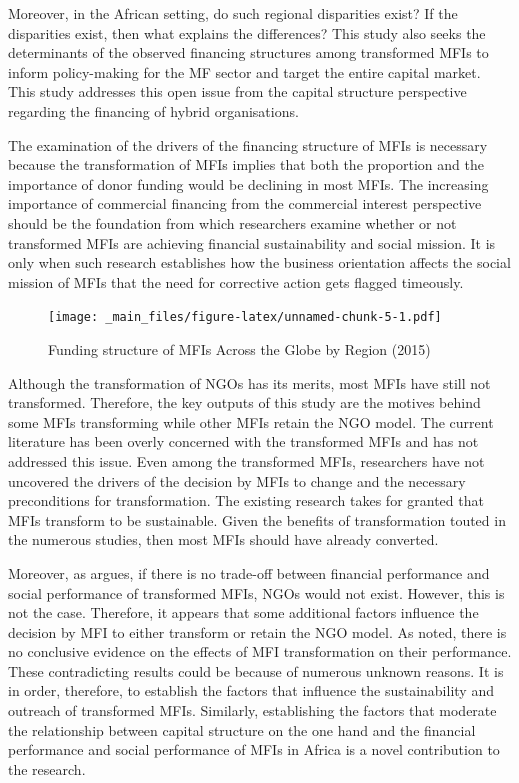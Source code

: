 \documentclass[a4paper, nobind]{templates/ociamthesis}
\begin{document}
Moreover, in the African setting, do such regional disparities exist? If the disparities exist, then what explains the differences? This study also seeks the determinants of the observed financing structures among transformed MFIs to inform policy-making for the MF sector and target the entire capital market. This study addresses this open issue from the capital structure perspective regarding the financing of hybrid organisations.

The examination of the drivers of the financing structure of MFIs is necessary because the transformation of MFIs implies that both the proportion and the importance of donor funding would be declining in most MFIs. The increasing importance of commercial financing from the commercial interest perspective should be the foundation from which researchers examine whether or not transformed MFIs are achieving financial sustainability and social mission. It is only when such research establishes how the business orientation affects the social mission of MFIs that the need for corrective action gets flagged timeously.

\begin{figure}
\centering
\texttt{[image: \_main\_files/figure-latex/unnamed-chunk-5-1.pdf]}
\caption{\label{fig:unnamed-chunk-5}Funding structure of MFIs Across the Globe by Region (2015)}
\end{figure}

Although the transformation of NGOs has its merits, most MFIs have still not transformed\autocite{d2017ngos}. Therefore, the key outputs of this study are the motives behind some MFIs transforming while other MFIs retain the NGO model. The current literature has been overly concerned with the transformed MFIs and has not addressed this issue. Even among the transformed MFIs, researchers have not uncovered the drivers of the decision by MFIs to change and the necessary preconditions for transformation. The existing research takes for granted that MFIs transform to be sustainable. Given the benefits of transformation touted in the numerous studies, then most MFIs should have already converted.

Moreover, as \textcite{morduch2019challenges} argues, if there is no trade-off between financial performance and social performance of transformed MFIs, NGOs would not exist. However, this is not the case. Therefore, it appears that some additional factors influence the decision by MFI to either transform or retain the NGO model. As noted, there is no conclusive evidence on the effects of MFI transformation on their performance. These contradicting results could be because of numerous unknown reasons. It is in order, therefore, to establish the factors that influence the sustainability and outreach of transformed MFIs. Similarly, establishing the factors that moderate the relationship between capital structure on the one hand and the financial performance and social performance of MFIs in Africa is a novel contribution to the research.
\end{document}
